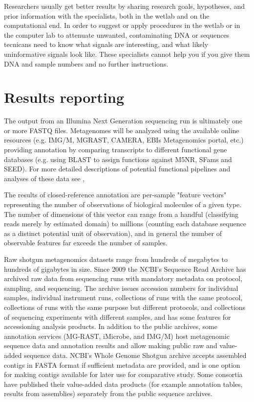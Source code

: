 \documentclass[graybox]{svmult}
\begin{document}
Researchers usually get better results by sharing research goals, hypotheses, and prior information with the specialists, both in the wetlab and on the computational end.  In order to suggest or apply procedures in the wetlab or in the computer lab to attenuate unwanted, contaminating DNA or sequences tecnicans need to know what signals are interesting, and what likely uninformative signals look like.  These specialists cannot help you if you give them DNA and sample numbers and no further instructions.  

\section{Results reporting }
\label{sec:5}

The output from an Illumina Next Generation sequencing run is ultimately one or more FASTQ files.\cite{Cock2010FASTQ} 
Metagenomes will be analyzed using the available online resources (e.g. IMG/M, MGRAST, CAMERA, EBIs Metagenomics portal, etc.) providing annotation by comparing transcripts to different functional gene databases (e.g. using BLAST to assign functions against M5NR, SFams and SEED). For more detailed descriptions of potential functional pipelines and analyses of these data see \cite{Thomas2012Metagenomics}, \cite{Meyer2008Metagenomics} \cite{Wilke2015RESTful}

        The results of closed-reference annotation are per-sample "feature vectors" representing the number of observations of biological molecules of a given type.  The number of dimensions of this vector can range from a handful (classifying reads merely by estimated domain) to millions (counting each database sequence as a distinct potential unit of observation), and in general the number of observable features far exceeds the number of samples.

        Raw shotgun metagenomics datasets range from hundreds of megabytes to hundreds of gigabytes in size.  Since 2009 the NCBI's Sequence Read Archive has archived raw data from sequencing runs with mandatory metadata on protocol, sampling, and sequencing.  The archive issues accession numbers for individual samples, individual instrument runs, collections of runs with the same protocol, collections of runs with the same purpose but different protocols, and collections of sequencing experiments with different samples, and has some features for accessioning analysis products.  
In addition to the public archives, some annotation services (MG-RAST, iMicrobe, and IMG/M) host metagenomic sequence data and annotation results and allow making public raw and value-added sequence data.    NCBI's Whole Genome Shotgun archive accepts assembled contigs in FASTA format if sufficient metadata are provided, and is one option for making contigs available for later use for comparative study.
Some consortia have published their value-added data products (for example annotation tables, results from assemblies) separately from the public sequence archives.
\end{document}
